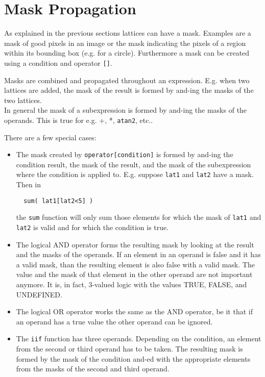 \section{\label{LEL:MASKS}Mask Propagation}
As explained in the previous sections lattices can have a mask.
Examples are a mask of good pixels in an image or the mask indicating
the pixels of a region within its bounding box (e.g. for a circle).
Furthermore a mask can be created using a condition and
operator \texttt{[]}.

Masks are combined and propagated throughout an expression.
E.g. when two lattices are added, the mask of the result is formed
by and-ing the masks of the two lattices.
\\In general the mask of a subexpression is formed by and-ing
the masks of the operands. This is true for e.g. +, *, \texttt{atan2},
etc..

There are a few special cases:
\begin{itemize}
\item
The mask created by \texttt{operator[condition]} is formed by and-ing the
condition result, the mask of the result, and the mask of the subexpression
where the condition is applied to. E.g. suppose \texttt{lat1} and
\texttt{lat2} have a mask. Then in
\begin{verbatim}
  sum( lat1[lat2<5] )
\end{verbatim}
the \texttt{sum} function will only sum those elements for which
the mask of \texttt{lat1} and \texttt{lat2} is valid and for which
the condition is true.

\item
The logical AND operator forms the resulting mask by looking at
the result and the masks of the operands. If an element in an
operand is false and it has a valid mask, than the resulting
element is also false with a valid mask. The value and the mask of
that element in the other operand are not important anymore.
It is, in fact, 3-valued logic with the values TRUE, FALSE, and UNDEFINED.

\item
The logical OR operator works the same as the AND operator, be it
that if an operand has a true value the other operand can be ignored.

\item
The \texttt{iif} function has three operands. Depending on the
condition, an element from the second or third operand has to be taken.
The resulting mask is formed by the mask of the condition and-ed
with the appropriate elements from the masks of the second and third operand.
\end{itemize}

